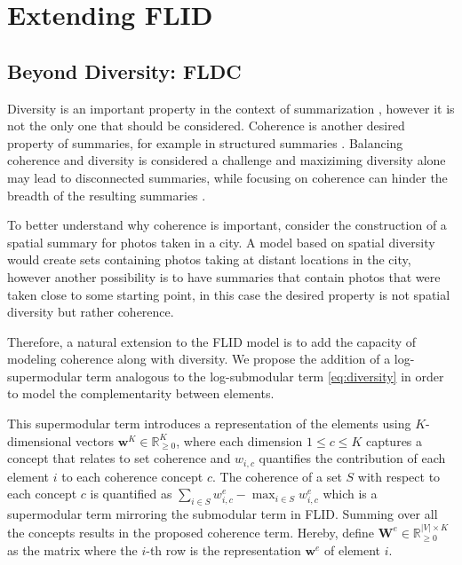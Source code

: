 \chapter{Extending FLID}
\label{sec:models}

\section{Beyond Diversity: FLDC}

Diversity is an important property in the context of summarization \citep{tschiatschek16learning}, however it is not the only one that should be considered. Coherence is another desired property of summaries, for example in structured summaries \citep{Yan:2011:ETS:2009916.2010016}. Balancing coherence and diversity is considered a challenge and maxiziming diversity alone may lead to disconnected summaries, while focusing on coherence can hinder the breadth of the resulting summaries \citep{Shahaf2012}.

To better understand why coherence is important, consider the construction of a spatial summary for photos taken in a city. A model based on spatial diversity would create sets containing photos taking at distant locations in the city, however another possibility is to have summaries that contain photos that were taken close to some starting point, in this case the desired property is not spatial diversity but rather coherence.

Therefore, a natural extension to the FLID model is to add the capacity of modeling coherence along with diversity. We propose the addition of a log-supermodular term analogous to the log-submodular term \eqref{eq:diversity} in order to model the complementarity between elements.

This supermodular term introduces a representation of the elements using $K$-dimensional vectors $\mathbf{w}^{K} \in \mathbb{R}^{K}_{\geq 0}$, where each dimension $1 \leq c \leq K$ captures a concept that relates to set coherence and $w_{i,c}$ quantifies the contribution of each element $i$ to each coherence concept $c$. The coherence of a set $S$ with respect to each concept $c$ is quantified as $\sum_{i \in S}{w^{e}_{i,c}} - \max_{i \in S}{w^{e}_{i,c}}$ which is a supermodular term mirroring the submodular term in FLID. Summing over all the concepts results in the proposed coherence term. Hereby, define $\mathbf{W}^{e} \in \mathbb{R}^{|V| \times K}_{\geq 0}$ as the matrix where the $i$-th row is the representation $\mathbf{w}^{e}$ of element $i$.

